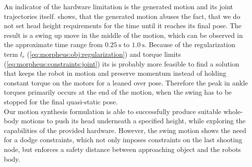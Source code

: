 \par
An indicator of the hardware limitation is the generated motion and its joint trajectories itself.
 shows, that the generated motion abuses the fact, that we do not set head height requirements for the time until it reaches its final pose.
The result is a swing up move in the middle of the motion, which can be observed in the approximate time range from $\SI{0.25}{\s}$ to $\SI{1.0}{\s}$.
Because of the regularization term $l_r$ (\cref{eq:morpheus:obj:regularization}) and torque limits (\cref{eq:morpheus:constraints:joint}) its is probably more feasible to find a solution that keeps the robot in motion and preserve momentum instead of holding constant torque on the motors for a leaned over pose.
Therefore the peak in ankle torques primarily occurs at the end of the motion, when the swing has to be stopped for the final quasi-static pose.
\\
Our motion synthesis formulation is able to successfully produce suitable whole-body motions to push its head underneath a specified height, while exploring the capabilities of the provided hardware.
However, the swing motion shows the need for a dodge constraints, which not only imposes constraints on the last shooting node, but enforces a safety distance between approaching object and the robots body.
